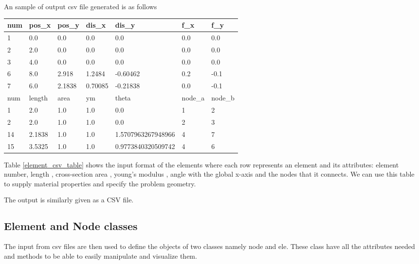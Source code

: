 An sample of output csv file generated is as follows
\begin{table}[]
	\begin{tabular}{|l|l|l|l|l|l|l|}
		\hline
		num & pos\_x & pos\_y & dis\_x             & dis\_y               & f\_x    & f\_y    \\
		\hline
		1   & 0.0    & 0.0    & 0.0                & 0.0                  & 0.0     & 0.0     \\
		2   & 2.0    & 0.0    & 0.0                & 0.0                  & 0.0     & 0.0     \\
		3   & 4.0    & 0.0    & 0.0                & 0.0                  & 0.0     & 0.0\\     
		6   & 8.0    & 2.918  & 1.2484 & -0.60462   & 0.2     & -0.1    \\
		7   & 6.0    & 2.1838 & 0.70085 & -0.21838  & 0.0     & -0.1    \\
		\hline

		num & length & area   & ym                 & theta                & node\_a & node\_b \\
		\hline
	
		1   & 2.0    & 1.0    & 1.0                & 0.0                  & 1       & 2       \\
	
		2   & 2.0    & 1.0    & 1.0                & 0.0                  & 2       & 3       \\

		14  & 2.1838 & 1.0    & 1.0                & 1.5707963267948966   & 4       & 7       \\
		
		15  & 3.5325 & 1.0    & 1.0                & 0.9773840320509742   & 4       & 6 \\ 
		\hline    
	\end{tabular}
\end{table}


Table \ref{element_csv_table} shows the input format of the elements where each row represents an element and its attributes: element number, length , cross-section area , young's modulus , angle with the global x-axis and the nodes that it connects. We can use this table to supply material properties and specify the problem geometry.

The output is similarly given as a CSV file.

\subsection{Element and Node classes}
The input from csv files are then used to define the objects of two classes namely node and ele. These class have all the attributes needed and methods to be able to easily manipulate and visualize them.


